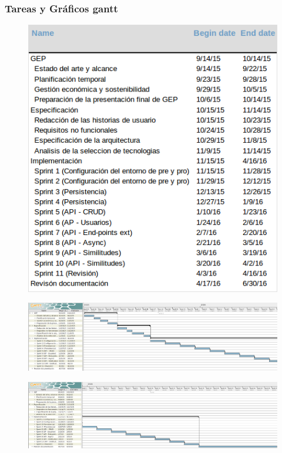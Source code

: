 \documentclass[12pt]{article} %
\begin{document}
\subsubsection{Tareas y Gráficos gantt}
\begin{landscape}

\begin{figure}[ht!]
\center
\includegraphics[width=\textwidth,height=\textheight,keepaspectratio]{Task.png}
\label{fig:task}
\end{figure}
\newpage

\begin{figure}[ht!]
\center
\includegraphics[width=\textwidth,height=\textheight,keepaspectratio]{Gantt_1.PNG}
\label{fig:gantt_1}
\end{figure}

\begin{figure}[ht!]
\center
\includegraphics[width=\textwidth,height=\textheight,keepaspectratio]{Gantt_2.PNG}
\label{fig:gantt_2}
\end{figure}

\end{landscape}
\newpage
\end{document}
